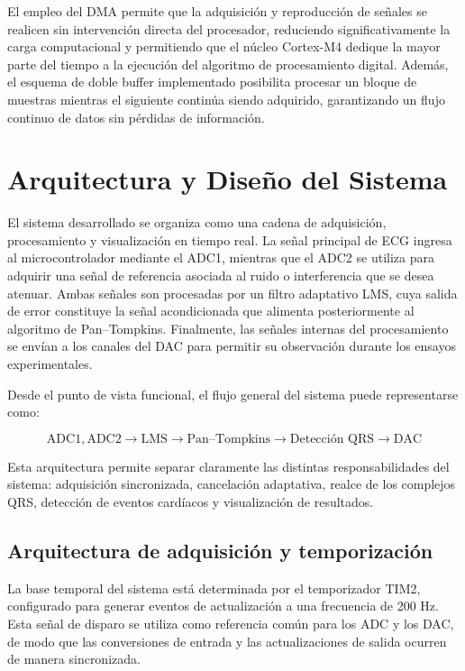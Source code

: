 \documentclass[12pt]{article}
\begin{document}
		El empleo del DMA permite que la adquisición y reproducción de señales se realicen sin intervención directa del procesador, reduciendo significativamente la carga computacional y permitiendo que el núcleo Cortex-M4 dedique la mayor parte del tiempo a la ejecución del algoritmo de procesamiento digital. Además, el esquema de doble buffer implementado posibilita procesar un bloque de muestras mientras el siguiente continúa siendo adquirido, garantizando un flujo continuo de datos sin pérdidas de información.
	
	\section{Arquitectura y Diseño del Sistema}

		El sistema desarrollado se organiza como una cadena de adquisición, procesamiento y visualización en tiempo real. La señal principal de ECG ingresa al microcontrolador mediante el ADC1, mientras que el ADC2 se utiliza para adquirir una señal de referencia asociada al ruido o interferencia que se desea atenuar. Ambas señales son procesadas por un filtro adaptativo LMS, cuya salida de error constituye la señal acondicionada que alimenta posteriormente al algoritmo de Pan--Tompkins. Finalmente, las señales internas del procesamiento se envían a los canales del DAC para permitir su observación durante los ensayos experimentales.

		Desde el punto de vista funcional, el flujo general del sistema puede representarse como:

		\[
		\mathrm{ADC1},\mathrm{ADC2}
		\rightarrow
		\mathrm{LMS}
		\rightarrow
		\text{Pan--Tompkins}
		\rightarrow
		\text{Detección QRS}
		\rightarrow
		\mathrm{DAC}
		\]

		Esta arquitectura permite separar claramente las distintas responsabilidades del sistema: adquisición sincronizada, cancelación adaptativa, realce de los complejos QRS, detección de eventos cardíacos y visualización de resultados.

		\subsection{Arquitectura de adquisición y temporización}

		La base temporal del sistema está determinada por el temporizador TIM2, configurado para generar eventos de actualización a una frecuencia de 200 Hz. Esta señal de disparo se utiliza como referencia común para los ADC y los DAC, de modo que las conversiones de entrada y las actualizaciones de salida ocurren de manera sincronizada.
\end{document}
